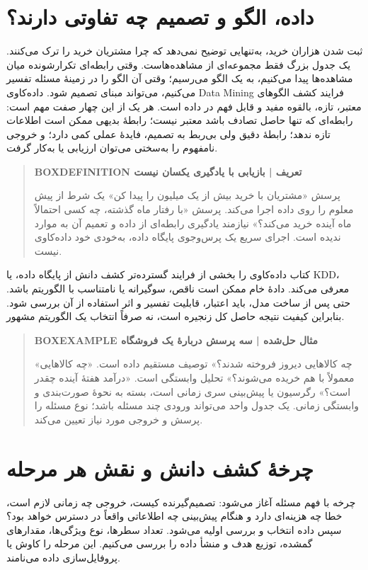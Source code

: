 \section{داده، الگو و تصمیم چه تفاوتی دارند؟}
ثبت شدن هزاران خرید، به‌تنهایی توضیح نمی‌دهد که چرا مشتریان خرید را ترک می‌کنند. یک جدول بزرگ فقط مجموعه‌ای از مشاهده‌هاست. وقتی رابطه‌ای تکرارشونده میان مشاهده‌ها پیدا می‌کنیم، به یک الگو می‌رسیم؛ وقتی آن الگو را در زمینهٔ مسئله تفسیر می‌کنیم، می‌تواند مبنای تصمیم شود. داده‌کاوی Data Mining فرایند کشف الگوهای معتبر، تازه، بالقوه مفید و قابل فهم در داده است. هر یک از این چهار صفت مهم است: رابطه‌ای که تنها حاصل تصادف باشد معتبر نیست؛ رابطهٔ بدیهی ممکن است اطلاعات تازه ندهد؛ رابطهٔ دقیق ولی بی‌ربط به تصمیم، فایدهٔ عملی کمی دارد؛ و خروجی نامفهوم را به‌سختی می‌توان ارزیابی یا به‌کار گرفت.

\begin{quote}\textbf{BOXDEFINITION تعریف | بازیابی با یادگیری یکسان نیست}\par 
پرسش «مشتریان با خرید بیش از یک میلیون را پیدا کن» یک شرط از پیش معلوم را روی داده اجرا می‌کند. پرسش «با رفتار ماه گذشته، چه کسی احتمالاً ماه آینده خرید می‌کند؟» نیازمند یادگیری رابطه‌ای از داده و تعمیم آن به موارد ندیده است. اجرای سریع یک پرس‌وجوی پایگاه داده، به‌خودی خود داده‌کاوی نیست.
\end{quote}

کتاب داده‌کاوی را بخشی از فرایند گسترده‌تر کشف دانش از پایگاه داده، یا KDD، معرفی می‌کند. دادهٔ خام ممکن است ناقص، سوگیرانه یا نامتناسب با الگوریتم باشد. حتی پس از ساخت مدل، باید اعتبار، قابلیت تفسیر و اثر استفاده از آن بررسی شود. بنابراین کیفیت نتیجه حاصل کل زنجیره است، نه صرفاً انتخاب یک الگوریتم مشهور.

\begin{quote}\textbf{BOXEXAMPLE مثال حل‌شده | سه پرسش دربارهٔ یک فروشگاه}\par 
«چه کالاهایی دیروز فروخته شدند؟» توصیف مستقیم داده است. «چه کالاهایی معمولاً با هم خریده می‌شوند؟» تحلیل وابستگی است. «درآمد هفتهٔ آینده چقدر است؟» رگرسیون یا پیش‌بینی سری زمانی است، بسته به نحوهٔ صورت‌بندی و وابستگی زمانی. یک جدول واحد می‌تواند ورودی چند مسئله باشد؛ نوع مسئله را پرسش و خروجی مورد نیاز تعیین می‌کند.
\end{quote}

\section{چرخهٔ کشف دانش و نقش هر مرحله}
چرخه با فهم مسئله آغاز می‌شود: تصمیم‌گیرنده کیست، خروجی چه زمانی لازم است، خطا چه هزینه‌ای دارد و هنگام پیش‌بینی چه اطلاعاتی واقعاً در دسترس خواهد بود؟ سپس داده انتخاب و بررسی اولیه می‌شود. تعداد سطرها، نوع ویژگی‌ها، مقدارهای گمشده، توزیع هدف و منشأ داده را بررسی می‌کنیم. این مرحله را کاوش یا پروفایل‌سازی داده می‌نامند.

